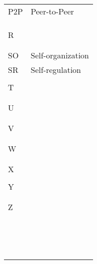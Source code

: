 \begin{tabular}{ll}
  P2P &  Peer-to-Peer\\ 
 &  \\ 
 &  \\ 
 &  \\ 
 R &  \\ 
 &  \\ 
 &  \\ 
 SO & Self-organization\\ 
 SR &  Self-regulation\\  
 &  \\ 
 T &  \\ 
 &  \\ 
 &  \\ 
 U &  \\ 
 &  \\ 
 &  \\ 
 V &  \\ 
 &  \\ 
 &  \\ 
 W &  \\ 
 &  \\ 
 &  \\ 
 X &  \\ 
 &  \\ 
 Y &  \\ 
 &  \\ 
 &  \\ 
 Z &  \\ 
 &  \\ 
 &  \\ 
 &  \\ 
 &  \\ 
 &  \\ 
 &  \\ 
 &  \\ 
 &  \\ 
 &  \\ 
 &  \\ 
 &  \\ 
 &  \\ 
 &  \\ 
 &  \\ 
 &  \\ 
\end{tabular} 